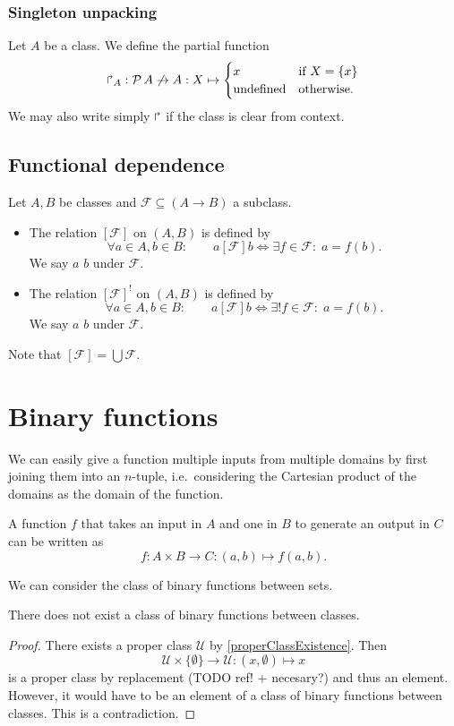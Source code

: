 \subsubsection{Singleton unpacking}
\begin{definition}
Let $A$ be a class. We define the partial function
\[ \operatorname{\Rsh}_A: \operatorname{\mathcal{P}}{A} \not\to A: X \mapsto \begin{cases}
x & \text{if $X = \{x\}$} \\
\text{undefined} & \text{otherwise}.
\end{cases} \]
We may also write simply $\operatorname{\Rsh}$ if the class is clear from context.
\end{definition}

\subsection{Functional dependence}
\begin{definition}
Let $A,B$ be classes and $\mathcal{F} \subseteq (A\to B)$ a subclass.
\begin{itemize}
\item The relation $[\mathcal{F}]$ on $(A,B)$ is defined by
\[ \forall a\in A, b\in B: \qquad a[\mathcal{F}]b \iff \exists f\in \mathcal{F}: \; a = f(b). \]
We say $a$  $b$ under $\mathcal{F}$.
\item The relation $[\mathcal{F}]^!$ on $(A,B)$ is defined by
\[ \forall a\in A, b\in B: \qquad a[\mathcal{F}]b \iff \exists! f\in \mathcal{F}: \; a = f(b). \]
We say $a$  $b$ under $\mathcal{F}$.
\end{itemize}
\end{definition}

Note that $[\mathcal{F}] = \bigcup\mathcal{F}$.

\section{Binary functions}
We can easily give a function multiple inputs from multiple domains by first joining them into an $n$-tuple, i.e.\ considering the Cartesian product of the domains as the domain of the function.

\begin{example}
A function $f$ that takes an input in $A$ and one in $B$ to generate an output in $C$ can be written as
\[ f: A\times B \to C: (a,b)\mapsto f(a,b). \]
\end{example}

We can consider the class of binary functions between sets.
\begin{lemma}
There does not exist a class of binary functions between classes.
\end{lemma}
\begin{proof}
There exists a proper class $\mathcal{U}$ by \ref{properClassExistence}. Then
\[ \mathcal{U}\times \{\emptyset\}\to \mathcal{U}: (x,\emptyset) \mapsto x \]
is a proper class by replacement (TODO ref! + necesary?) and thus an element. However, it would have to be an element of a class of binary functions between classes. This is a contradiction.
\end{proof}

